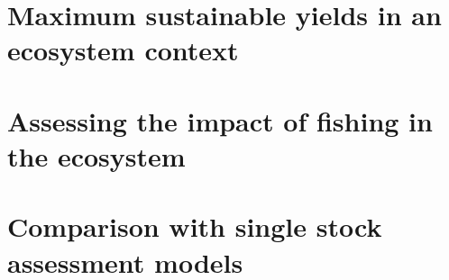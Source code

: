 \lipsum[1-2]

\section{Maximum sustainable yields in an ecosystem context}
\lipsum[1-5]

\section{Assessing the impact of fishing in the ecosystem}
\lipsum[6-10]

\section{Comparison with single stock assessment models}
\lipsum[11-15]